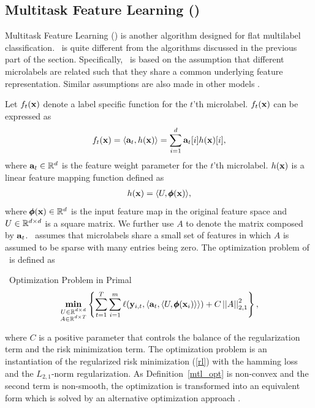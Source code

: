 {%
%
\subsection{Multitask Feature Learning (\mtl)} \label{sc_mtl}

Multitask Feature Learning (\mtl) \citep{Argyriou07multitask} is another algorithm designed for flat multilabel classification.
\mtl\ is quite different from the algorithms discussed in the previous part of the section.
Specifically, \mtl\ is based on the assumption that different microlabels are related such that they share a common underlying feature representation.
Similar assumptions are also made in other models \citep{Caruana97multitask,Baxter00a,BenDavide03exploiting}.

Let $f_t(\mathbf {x})$ denote a label specific function for the $t$'th microlabel.
$f_t(\mathbf {x})$ can be expressed as
\begin{align*}
	f_t(\mathbf {x}) = \langle \mathbf {a}_t, h(\mathbf {x}) \rangle = \sum_{i=1}^{d}\mathbf {a}_{t}[i]h(\mathbf {x})[i],
\end{align*}
where $\mathbf {a}_t\in\mathbb{R}^d$ is the feature weight parameter for the $t$'th microlabel.
$h(\mathbf {x})$ is a linear feature mapping function defined as
\begin{align*}
	h(\mathbf {x}) = \langle U, \pmb \phi(\mathbf {x}) \rangle,
\end{align*}
where $\pmb \phi(\mathbf {x})\in\mathbb{R}^d$ is the input feature map in the original feature space and $U\in\mathbb{R}^{d\times d}$ is a square matrix.
We further use $A$ to denote the matrix composed by $\mathbf {a}_{t}$.
\mtl\ assumes that microlabels share a small set of features in which $A$ is assumed to be sparse with many entries being zero.
The optimization problem of \mtl\ is defined as
\begin{definition}{\mtl\ Optimization Problem in Primal}\label{mtl_opt}
	\begin{align*}
		\underset{\substack{U\in\mathbb{R}^{d\times d}\\A\in\mathbb{R}^{d\times T}}}{\textbf{min}} \left\{\sum_{t=1}^{T}\sum_{i=1}^{m}\ell(\mathbf {y}_{i,t},\langle \mathbf {a}_t, \langle U, \pmb \phi(\mathbf {x}_i) \rangle \rangle)+C\left|\left| A \right|\right|_{2,1}^2\right\},
	\end{align*}
\end{definition}
\noindent
where $C$ is a positive parameter that controls the balance of the regularization term and the risk minimization term.
The optimization problem is an instantiation of the regularized risk minimization (\ref{rl}) with the hamming loss and the $L_{2,1}$-norm regularization.
As Definition~\ref{mtl_opt} is non-convex and the second term is non-smooth, the optimization is transformed into an equivalent form which is solved by an alternative optimization approach \citep{Argyriou07multitask}.

}
